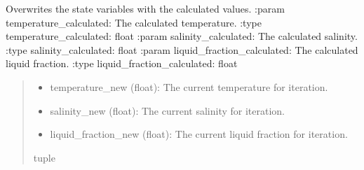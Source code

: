 \documentclass[a4paper,11pt,english,openany]{sphinxmanual}
\begin{document}
\begin{fulllineitems}
\label{\detokenize{api/spyice.statevariables:src.spyice.statevariables.overwrite_statevariables}}
\pysigstartsignatures
\pysiglinewithargsret
{}
{\sphinxparamcomma {}\sphinxparamcomma {}\sphinxparamcomma {}\sphinxparamcomma {}}
{}
\pysigstopsignatures
\sphinxAtStartPar
Overwrites the state variables with the calculated values.
:param temperature\_calculated: The calculated temperature.
:type temperature\_calculated: float
:param salinity\_calculated: The calculated salinity.
:type salinity\_calculated: float
:param liquid\_fraction\_calculated: The calculated liquid fraction.
:type liquid\_fraction\_calculated: float
\begin{quote}\begin{description}
\sphinxAtStartPar
\begin{description}
\begin{itemize}
\item {} 
\sphinxAtStartPar
temperature\_new (float): The current temperature for iteration.

\item {} 
\sphinxAtStartPar
salinity\_new (float): The current salinity for iteration.

\item {} 
\sphinxAtStartPar
liquid\_fraction\_new (float): The current liquid fraction for iteration.

\end{itemize}

\end{description}


\sphinxAtStartPar
tuple

\end{description}\end{quote}

\end{fulllineitems}

\end{document}
